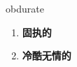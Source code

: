 
\begin{frame}
{\huge obdurate}
\begin{center}
\begin{enumerate}\Large
  \item \textbf{固执的}
  \item \textbf{冷酷无情的}
\end{enumerate}
\end{center}
\end{frame}

